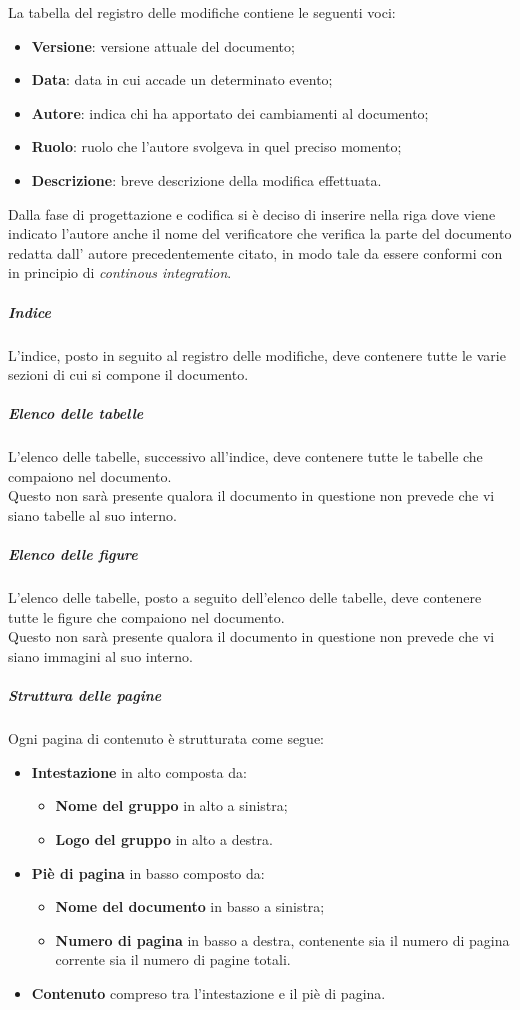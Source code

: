 La tabella del registro delle modifiche contiene le seguenti voci:
\begin{itemize}
    \item \textbf{Versione}: versione attuale del documento;
    \item \textbf{Data}: data in cui accade un determinato evento;
    \item \textbf{Autore}: indica chi ha apportato dei cambiamenti al documento;
    \item \textbf{Ruolo}: ruolo che l'autore svolgeva in quel preciso momento;
    \item \textbf{Descrizione}: breve descrizione della modifica effettuata.
          \end {itemize}
     Dalla fase di progettazione e codifica si è deciso di inserire nella riga dove viene indicato l'autore anche il nome del verificatore che verifica la parte del documento redatta dall' autore precedentemente citato, in modo tale da essere conformi con in principio di \textit{continous integration}.      
          \subparagraph{Indice}
          L'indice, posto in seguito al registro delle modifiche, deve contenere tutte le varie sezioni di cui si compone il documento.
          \subparagraph{Elenco delle tabelle}
          L'elenco delle tabelle, successivo all'indice, deve contenere tutte le tabelle che compaiono nel documento.\\
          Questo non sarà presente qualora il documento in questione non prevede che vi siano tabelle al suo interno.
          \subparagraph{Elenco delle figure}
          L'elenco delle tabelle, posto a seguito dell'elenco delle tabelle, deve contenere tutte le figure che compaiono nel documento.\\
          Questo non sarà presente qualora il documento in questione non prevede che vi siano immagini al suo interno.

          \subparagraph{Struttura delle pagine}
          Ogni pagina di contenuto è strutturata come segue:
          \begin {itemize}
    \item \textbf{Intestazione} in alto composta da:
          \begin {itemize}
    \item \textbf{Nome del gruppo} in alto a sinistra;
    \item \textbf{Logo del gruppo} in alto a destra.
\end{itemize}
\item \textbf{Piè di pagina} in basso composto da:
\begin{itemize}
\item \textbf{Nome del documento} in basso a sinistra;
\item \textbf{Numero di pagina} in basso a destra, contenente sia il numero di pagina corrente sia il numero di pagine totali.
\end {itemize}
\item \textbf{Contenuto} compreso tra l'intestazione e il piè di pagina.
\end {itemize}


